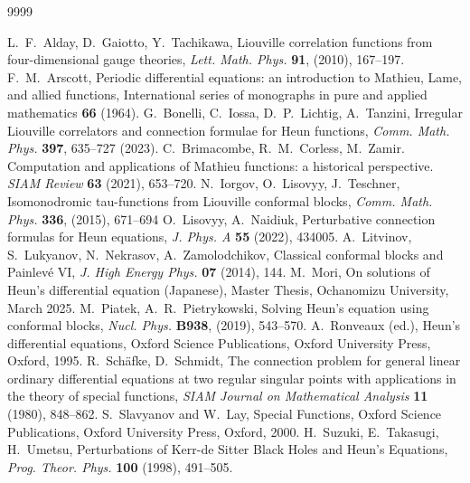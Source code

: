 \documentclass[12pt]{amsart}
\numberwithin{equation}{section}
\theoremstyle{definition}
\theoremstyle{remark}
\begin{document}
\begin{thebibliography}{9999}

L.~F.~Alday, D.~Gaiotto, Y.~Tachikawa, Liouville correlation functions from four-dimensional gauge theories, \textit{Lett. Math. Phys.} \textbf{91}, (2010), 167--197.
F.~M.~Arscott, Periodic differential equations: an introduction to Mathieu, Lame, and allied functions, International series of monographs in pure and applied mathematics \textbf{66} (1964).
G.~Bonelli, C.~Iossa, D.~P.~Lichtig, A.~Tanzini, Irregular Liouville correlators and connection formulae for Heun functions,  {\it Comm. Math. Phys.} {\bf 397}, 635--727 (2023).
C.~Brimacombe, R.~M.~Corless, M.~Zamir. Computation and applications of Mathieu functions: a historical perspective. \textit{SIAM Review} \textbf{63} (2021), 653--720.
N.~Iorgov, O.~Lisovyy, J.~Teschner, Isomonodromic tau-functions from Liouville conformal blocks, \textit{Comm. Math. Phys.} \textbf{336}, (2015), 671--694
O.~Lisovyy, A.~Naidiuk, Perturbative connection formulas for Heun equations, {\it J. Phys. A} {\bf 55} (2022), 434005.
A.~Litvinov, S.~Lukyanov, N.~Nekrasov, A.~Zamolodchikov, Classical conformal blocks and Painlev\'e VI, \textit{J. High Energy Phys.} {\bf 07} (2014), 144.
M.~Mori, On solutions of Heun's differential equation (Japanese), Master Thesis, Ochanomizu University, March 2025.
M.~Piatek, A.~R.~Pietrykowski, Solving Heun's equation using conformal blocks, \textit{Nucl. Phys.} \textbf{B938}, (2019),
543--570.
A.~Ronveaux (ed.), Heun's differential equations, Oxford Science Publications, Oxford University Press, Oxford, 1995.
R.~Sch{\"a}fke, D.~Schmidt, The connection problem for general linear ordinary differential equations at two regular singular points with applications in the theory of special functions, {\textit{SIAM Journal on Mathematical Analysis}} \textbf{11} (1980), 848--862.
S.~Slavyanov and W.~Lay, Special Functions, Oxford Science Publications, Oxford University Press, Oxford, 2000.
H.~Suzuki, E.~Takasugi, H.~Umetsu, Perturbations of Kerr-de Sitter Black Holes and Heun's Equations, {\textit{Prog. Theor. Phys.}} \textbf{100} (1998), 491--505.

\end{thebibliography}
\end{document}

